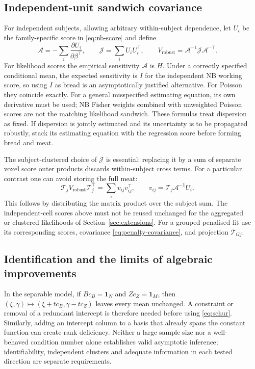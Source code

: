 \documentclass[11pt,a4paper]{article}
\numberwithin{equation}{section}
\begin{document}
\subsection{Independent-unit sandwich covariance}
For independent subjects, allowing arbitrary within-subject dependence, let
$U_i$ be the family-specific score in \eqref{eq:nb-score} and define
\begin{equation}\label{eq:sandwich}
 \mathcal A=-\sum_i\frac{\partial U_i}{\partial\beta^\top},\qquad
 \mathcal J=\sum_i U_iU_i^\top,\qquad
 V_{\mathrm{robust}}=\mathcal A^{-1}\mathcal J\mathcal A^{-\top}.
\end{equation}
For likelihood scores the empirical sensitivity $\mathcal A$ is $H$.
Under a correctly specified conditional mean, the expected sensitivity is
$I$ for the independent NB working score, so using $I$ as bread is an
asymptotically justified alternative. For Poisson they coincide exactly.
For a general misspecified estimating equation, its own derivative must be
used; NB Fisher weights combined with unweighted Poisson scores are not
the matching likelihood sandwich.
These formulas treat dispersion as fixed. If dispersion is jointly estimated
and its uncertainty is to be propagated robustly, stack its estimating
equation with the regression score before forming bread and meat.

The subject-clustered choice of $\mathcal J$ is essential: replacing it by a
sum of separate voxel score outer products discards within-subject cross terms.
For a particular contrast one can avoid storing the full meat:
\begin{equation}
 \mathcal T_jV_{\mathrm{robust}}\mathcal T_j^\top
 =\sum_i v_{ij}v_{ij}^\top,\qquad
 v_{ij}=\mathcal T_j\mathcal A^{-1}U_i.
\end{equation}
This follows by distributing the matrix product over the subject sum.
The independent-cell scores above must not be reused unchanged for the
aggregated or clustered likelihoods of Section~\ref{sec:extensions}.
For a grouped penalised fit use its corresponding scores, covariance
\eqref{eq:penalty-covariance}, and projection $\mathcal T_{Gj}$.

\subsection{Identification and the limits of algebraic improvements}
In the separable model, if $Bc_B=\mathbf1_N$ and $Zc_Z=\mathbf1_M$,
then $(\xi,\gamma)\mapsto(\xi+t c_B,\gamma-t c_Z)$ leaves every mean
unchanged. A constraint or removal of a redundant intercept is therefore
needed before using \eqref{eq:schur}. Similarly, adding an intercept column
to a basis that already spans the constant function can create rank
deficiency. Neither a large sample size nor a well-behaved condition number
alone establishes valid asymptotic inference; identifiability, independent
clusters and adequate information in each tested direction are separate
requirements.
\end{document}
